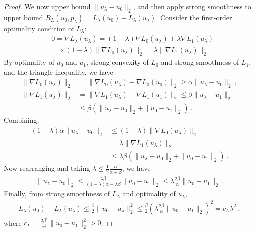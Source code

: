 \documentclass{article}
\theoremstyle{definition}\newtheorem{definition}{Definition}
\theoremstyle{definition}\newtheorem{assumption}{Assumption}
\begin{document}
\begin{proof}
  We now upper bound $\|u_\lambda - u_0\|_2$, and then apply strong smoothness to upper bound $R_L(u_0,p_{\lambda}) = L_\lambda(u_0) - L_\lambda(u_\lambda)$.
  Consider the first-order optimality condition of $L_\lambda$:
  \begin{align*}
    \label{eq:first-order-opt-smooth}
    & 0 = \nabla L_\lambda(u_\lambda) = (1-\lambda) \nabla L_0(u_\lambda) + \lambda \nabla L_1(u_\lambda)
    \\
    & \implies (1-\lambda) \|\nabla L_0(u_\lambda)\|_2 = \lambda \|\nabla L_1(u_\lambda)\|_2~.
  \end{align*}
  By optimality of $u_0$ and $u_1$, strong convexity of $L_0$ and strong smoothness of $L_1$, and the triangle inequality, we have
  \begin{align*}
    \|\nabla L_0(u_\lambda)\|_2 &= \|\nabla L_0(u_\lambda) - \nabla L_0(u_0)\|_2 \geq \alpha \|u_\lambda - u_0\|_2~,
    \\
    \|\nabla L_1(u_\lambda)\|_2 &= \|\nabla L_1(u_\lambda) - \nabla L_1(u_1)\|_2 \leq \beta \|u_\lambda - u_1\|_2
    \\
    &\leq \beta \left( \|u_\lambda - u_0\|_2 + \|u_0 - u_1\|_2 \right)~.
  \end{align*}
  Combining,
  \begin{align*}
    (1-\lambda) \alpha \|u_\lambda - u_0\|_2
    &\leq
      (1-\lambda) \|\nabla L_0(u_\lambda)\|_2
    \\
    &= \lambda \|\nabla L_1(u_\lambda)\|_2
    \\
    &\leq
      \lambda \beta \left( \|u_\lambda - u_0\|_2 + \|u_0 - u_1\|_2 \right)~.
  \end{align*}
  Now rearranging and taking $\lambda \leq \tfrac 1 2 \tfrac {\alpha}{\alpha+\beta}$, we have
  \begin{align*}
    \|u_\lambda - u_0\|_2 \leq \frac{\lambda\beta}{(1-\lambda)\alpha-\lambda\beta} \|u_0 - u_1\|_2  \leq \lambda \frac{2\beta}{\alpha} \|u_0 - u_1\|_2 ~.
  \end{align*}
  Finally, from strong smoothness of $L_\lambda$ and optimality of $u_\lambda$,
  \begin{align*}
    L_\lambda(u_0) - L_\lambda(u_\lambda) \leq \frac{\beta}{2} \|u_0 - u_\lambda\|_2^2 \leq \frac{\beta}{2} \left(\lambda \frac{2\beta}{\alpha} \|u_0 - u_1\|_2\right)^2 = c_L \lambda^2~,
  \end{align*}
  where $c_L = \frac{2\beta^3}{\alpha^2} \|u_0 - u_1\|_2^2 > 0$.


\end{proof}
\end{document}
